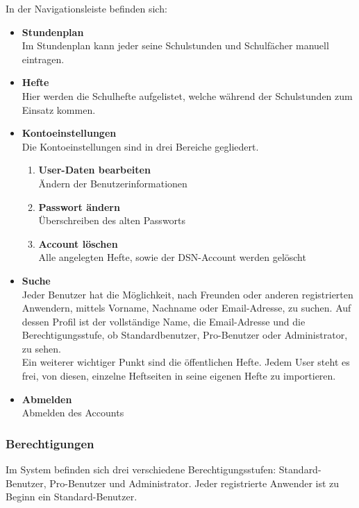 
In der Navigationsleiste befinden sich:
\begin{itemize}
\item \textbf{Stundenplan}\\ Im Stundenplan kann jeder seine Schulstunden und Schulfächer manuell eintragen.
\item \textbf{Hefte}\\ Hier werden die Schulhefte aufgelistet, welche während der Schulstunden zum Einsatz kommen.
\item \textbf{Kontoeinstellungen}\\ Die Kontoeinstellungen sind in drei Bereiche gegliedert.
\begin{enumerate}
\item \textbf{User-Daten bearbeiten}\\ Ändern der Benutzerinformationen
\item \textbf{Passwort ändern}\\ Überschreiben des alten Passworts
\item \textbf{Account löschen}\\ Alle angelegten Hefte, sowie der DSN-Account werden gelöscht
\end{enumerate}
\item \textbf{Suche}\\ Jeder Benutzer hat die Möglichkeit, nach Freunden oder anderen registrierten Anwendern, mittels Vorname, Nachname oder Email-Adresse, zu suchen. Auf dessen Profil ist der vollständige Name, die Email-Adresse und die Berechtigungsstufe, ob Standardbenutzer, Pro-Benutzer oder Administrator, zu sehen.\\
Ein weiterer wichtiger Punkt sind die öffentlichen Hefte. Jedem User steht es frei, von diesen, einzelne Heftseiten in seine eigenen Hefte zu importieren.
\item \textbf{Abmelden}\\ Abmelden des Accounts
\end{itemize}
\newpage 

\subsubsection{Berechtigungen}
Im System befinden sich drei verschiedene Berechtigungsstufen: Standard-Benutzer, Pro-Benutzer und Administrator. Jeder registrierte Anwender ist zu Beginn ein Standard-Benutzer.

